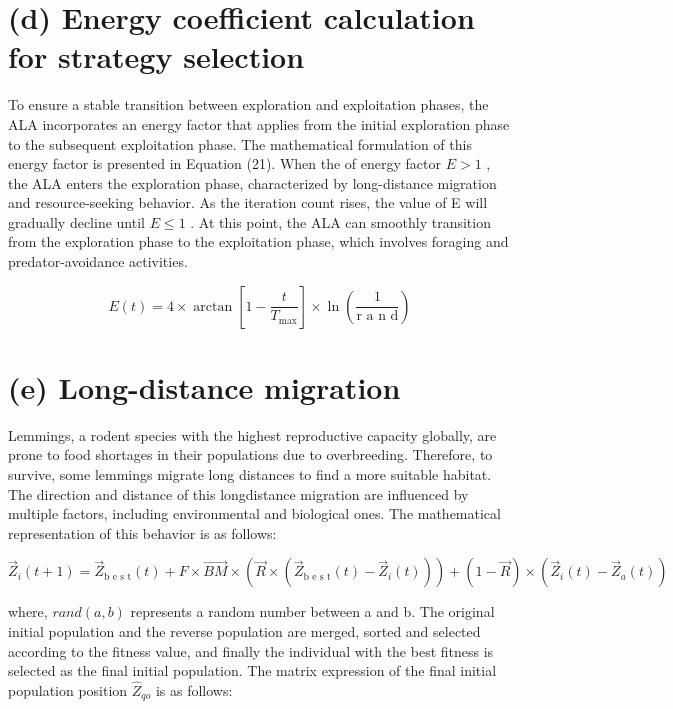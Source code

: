 \documentclass[
  10
]{article}
\begin{document}
\section{(d) Energy coefficient calculation for strategy
selection}\label{d-energy-coefficient-calculation-for-strategy-selection}

To ensure a stable transition between exploration and exploitation
phases, the ALA incorporates an energy factor that applies from the
initial exploration phase to the subsequent exploitation phase. The
mathematical formulation of this energy factor is presented in Equation
(21). When the of energy factor \(E > 1\) , the ALA enters the
exploration phase, characterized by long-distance migration and
resource-seeking behavior. As the iteration count rises, the value of E
will gradually decline until \(E \leq 1\) . At this point, the ALA can
smoothly transition from the exploration phase to the exploitation
phase, which involves foraging and predator-avoidance activities.

\[
E (t) = 4 \times \arctan \left[ 1 - \frac {t}{T _ {\max}} \right] \times \ln \left(\frac {1}{\text {r a n d}}\right) \tag {21}
\]

\section{(e) Long-distance migration}\label{e-long-distance-migration}

Lemmings, a rodent species with the highest reproductive capacity
globally, are prone to food shortages in their populations due to
overbreeding. Therefore, to survive, some lemmings migrate long
distances to find a more suitable habitat. The direction and distance of
this longdistance migration are influenced by multiple factors,
including environmental and biological ones. The mathematical
representation of this behavior is as follows:

\[
\overrightarrow {Z} _ {i} (t + 1) = \overrightarrow {Z} _ {\text {b e s t}} (t) + F \times \overrightarrow {B M} \times \left(\overrightarrow {R} \times \left(\overrightarrow {Z} _ {\text {b e s t}} (t) - \overrightarrow {Z} _ {i} (t)\right)\right) + \left(1 - \overrightarrow {R}\right) \times \left(\overrightarrow {Z} _ {i} (t) - \overrightarrow {Z} _ {a} (t)\right) \tag {22}
\]

where, \(r a n d ( a , b )\) represents a random number between a and b.
The original initial population and the reverse population are merged,
sorted and selected according to the fitness value, and finally the
individual with the best fitness is selected as the final initial
population. The matrix expression of the final initial population
position \({ \widehat { Z } } _ { q o }\) is as follows:
\end{document}
